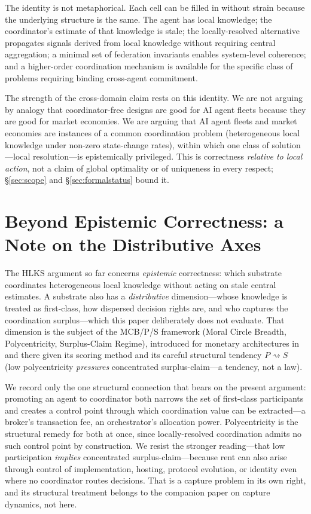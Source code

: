\documentclass[11pt]{article}
\theoremstyle{definition}
\theoremstyle{plain}
\theoremstyle{plain}
\begin{document}
The identity is not metaphorical. Each cell can be filled in without
strain because the underlying structure is the same. The agent has local
knowledge; the coordinator's estimate of that knowledge is stale; the
locally-resolved alternative propagates signals derived from local knowledge
without requiring central aggregation; a minimal set of federation invariants
enables system-level coherence; and a higher-order coordination mechanism is
available for the specific class of problems requiring binding cross-agent
commitment.

The strength of the cross-domain claim rests on this identity. We are not
arguing by analogy that coordinator-free designs are good for AI agent fleets
because they are good for market economies. We are arguing that AI agent
fleets and market economies are instances of a common coordination problem
(heterogeneous local knowledge under non-zero state-change rates), within which
one class of solution---local resolution---is epistemically privileged. This is
correctness \emph{relative to local action}, not a claim of global optimality or
of uniqueness in every respect; \S\ref{sec:scope} and \S\ref{sec:formalstatus}
bound it.

\section{Beyond Epistemic Correctness: a Note on the Distributive Axes}
\label{sec:mcbps}

The HLKS argument so far concerns \emph{epistemic} correctness: which substrate
coordinates heterogeneous local knowledge without acting on stale central estimates.
A substrate also has a \emph{distributive} dimension---whose knowledge is treated as
first-class, how dispersed decision rights are, and who captures the coordination
surplus---which this paper deliberately does not evaluate. That dimension is the
subject of the MCB/P/S framework (Moral Circle Breadth, Polycentricity,
Surplus-Claim Regime), introduced for monetary architectures in~\cite{nicholson2025}
and there given its scoring method and its careful structural tendency
$P \rightsquigarrow S$ (low polycentricity \emph{pressures} concentrated
surplus-claim---a tendency, not a law).

We record only the one structural connection that bears on the present argument:
promoting an agent to coordinator both narrows the set of first-class participants
and creates a control point through which coordination value can be extracted---a
broker's transaction fee, an orchestrator's allocation power. Polycentricity is the
structural remedy for both at once, since locally-resolved coordination admits no
such control point by construction. We resist the stronger reading---that low
participation \emph{implies} concentrated surplus-claim---because rent can also arise
through control of implementation, hosting, protocol evolution, or identity even
where no coordinator routes decisions. That is a capture problem in its own right,
and its structural treatment belongs to the companion paper on capture dynamics, not
here.
\end{document}
